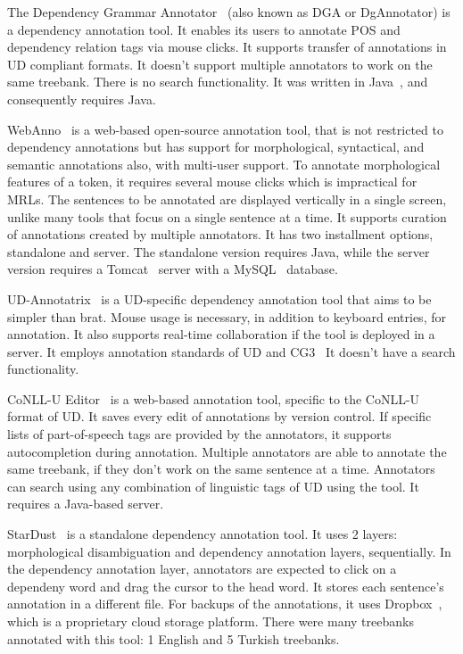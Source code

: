 The Dependency Grammar Annotator~\cite{dgannotator} (also known as DGA or DgAnnotator) is a dependency annotation tool.
It enables its users to annotate POS and dependency relation tags via mouse clicks.
It supports transfer of annotations in UD compliant formats.
It doesn't support multiple annotators to work on the same treebank.
There is no search functionality.
It was written in Java~\cite{java}, and consequently requires Java.

WebAnno~\cite{webanno} is a web-based open-source annotation tool, that is not restricted to dependency annotations but has support for morphological, syntactical, and semantic annotations also, with multi-user support.
To annotate morphological features of a token, it requires several mouse clicks which is impractical for MRLs.
The sentences to be annotated are displayed vertically in a single screen, unlike many tools that focus on a single sentence at a time.
It supports curation of annotations created by multiple annotators.
It has two installment options, standalone and server.
The standalone version requires Java, while the server version requires a Tomcat~\cite{tomcat} server with a MySQL~\cite{mysql} database.

UD-Annotatrix~\cite{ud-annotatrix} is a UD-specific dependency annotation tool that aims to be simpler than brat.
Mouse usage is necessary, in addition to keyboard entries, for annotation.
It also supports real-time collaboration if the tool is deployed in a server.
It employs annotation standards of UD and CG3~\cite{cg3}
It doesn't have a search functionality.

CoNLL-U Editor~\cite{conll-u_editor} is a web-based annotation tool, specific to the CoNLL-U~\cite{conll} format of UD.
It saves every edit of annotations by version control.
If specific lists of part-of-speech tags are provided by the annotators, it supports autocompletion during annotation.
Multiple annotators are able to annotate the same treebank, if they don't work on the same sentence at a time.
Annotators can search using any combination of linguistic tags of UD using the tool.
It requires a Java-based server.

StarDust~\cite{stardust} is a standalone dependency annotation tool.
It uses 2 layers: morphological disambiguation and dependency annotation layers, sequentially.
In the dependency annotation layer, annotators are expected to click on a dependeny word and drag the cursor to the head word.
It stores each sentence's annotation in a different file.
For backups of the annotations, it uses Dropbox~\cite{dropbox}, which is a proprietary cloud storage platform.
There were many treebanks annotated with this tool: 1 English and 5 Turkish treebanks.


